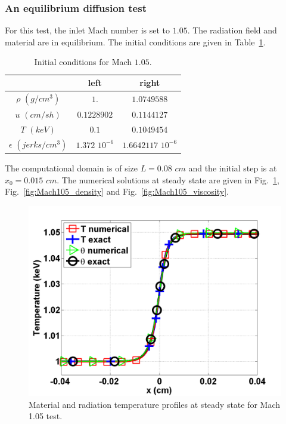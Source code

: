 \documentclass[review]{elsarticle}
\newcommand{\fig}[1]{Fig.~\ref{#1}}                      %
\newcommand{\tbl}[1]{Table~\ref{#1}}                     %
\begin{document}
\subsubsection{An equilibrium diffusion test}

For this test, the inlet Mach number is set to $1.05$. The radiation field and material are in equilibrium. The initial conditions are given in \tbl{tbl:table3}.
\begin{table}[h]
\begin{center}
\caption{\label{tbl:table3} Initial conditions for Mach $1.05$.}
\begin{tabular}{|c|c|c|}
\hline 
 & left  & right \\ \hline
$\rho$ $(g/cm^3)$ &$1.$ & $1.0749588$ \\ \hline
$u$ $(cm/sh)$& $0.1228902$ & $0.1144127$ \\ \hline
$T$ $(keV)$& $0.1$ & $0.1049454$\\ \hline
$\epsilon$ $(jerks/cm^3)$ & $1.372$ $10^{-6}$ & $1.6642117$ $10^{-6}$\\
\hline
\end{tabular}
\end{center}  
\end{table}  
The computational domain is of size $L=0.08$ $cm$ and the initial step is at $x_0 = 0.015$ $cm$. The numerical solutions at steady state are given in \fig{fig:Mach105_temp}, \fig{fig:Mach105_density} and \fig{fig:Mach105_viscosity}. 
\begin{figure}[H]
                \centering
                \includegraphics[width=\textwidth]{Mach_1p05_nel_500_temperature.png}
        \caption{Material and radiation temperature profiles at steady state for Mach 1.05 test.}\label{fig:Mach105_temp}
\end{figure}
\end{document}
